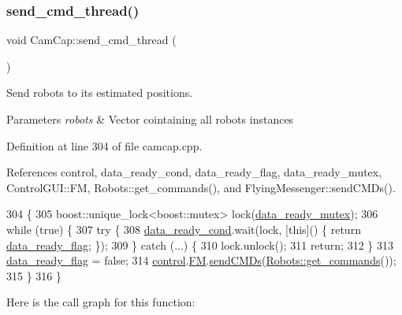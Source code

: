 \subsubsection{\texorpdfstring{send\+\_\+cmd\+\_\+thread()}{send\_cmd\_thread()}}
{\footnotesize\ttfamily void Cam\+Cap\+::send\+\_\+cmd\+\_\+thread (\begin{DoxyParamCaption}{ }\end{DoxyParamCaption})}



Send robots to its estimated positions. 


\begin{DoxyParams}{Parameters}
{\em robots} & Vector cointaining all robots instances \\
\hline
\end{DoxyParams}


Definition at line 304 of file camcap.\+cpp.



References control, data\+\_\+ready\+\_\+cond, data\+\_\+ready\+\_\+flag, data\+\_\+ready\+\_\+mutex, Control\+G\+U\+I\+::\+FM, Robots\+::get\+\_\+commands(), and Flying\+Messenger\+::send\+C\+M\+Ds().


\begin{DoxyCode}
304                              \{
305     boost::unique\_lock<boost::mutex> lock(\hyperlink{class_cam_cap_af1a617d50c6eed145fe96fd4b40e73bf}{data\_ready\_mutex});
306     \textcolor{keywordflow}{while} (\textcolor{keyword}{true}) \{
307         \textcolor{keywordflow}{try} \{
308             \hyperlink{class_cam_cap_a609ffa71782939a4428485a191202bbc}{data\_ready\_cond}.wait(lock, [\textcolor{keyword}{this}]() \{ \textcolor{keywordflow}{return} 
      \hyperlink{class_cam_cap_a6ebbdd1217a68d77959aec45c7ea59e2}{data\_ready\_flag}; \});
309         \} \textcolor{keywordflow}{catch} (...) \{
310             lock.unlock();
311             \textcolor{keywordflow}{return};
312         \}
313         \hyperlink{class_cam_cap_a6ebbdd1217a68d77959aec45c7ea59e2}{data\_ready\_flag} = \textcolor{keyword}{false};
314         \hyperlink{class_cam_cap_a0e2b26d564d6baa6f5f60ce7227ad53f}{control}.\hyperlink{class_control_g_u_i_a16612b604257a888faac7a1d7e9e3e51}{FM}.\hyperlink{class_flying_messenger_a97b0db02039cde3d9d80225e4db0f23a}{sendCMDs}(\hyperlink{class_robots_a34e3959011295509ab032e3d96b3cd61}{Robots::get\_commands}());
315     \}
316 \}
\end{DoxyCode}
Here is the call graph for this function\+:
\mbox{\label{class_cam_cap_ae676e6624dd821ad494a80e68a41e249}} 

